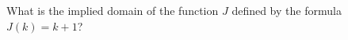 \documentclass{ximera}
\begin{document}
\begin{exercise}
What is the implied domain of the function $J$ defined by the formula $J(k) = k+1$?

\begin{multipleChoice}
\choice[correct]{$(-\infty, \infty)$}
\choice{$[-\infty, \infty]$}
\end{multipleChoice}

\end{exercise}
\end{document}
